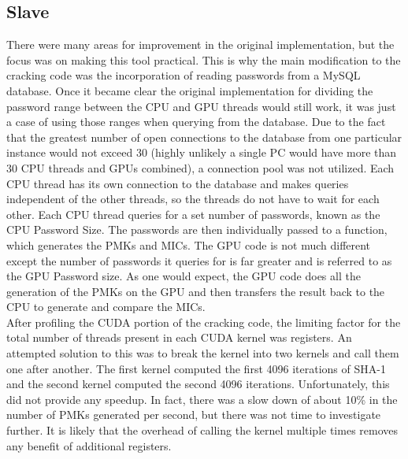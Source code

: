 \documentclass[12pt]{article}
\begin{document}
\subsection{Slave}
\indent There were many areas for improvement in the original implementation, but the focus was on making this tool practical. This is why the main modification to the cracking code was the incorporation of reading passwords from a MySQL database. Once it became clear the original implementation for dividing the password range between the CPU and GPU threads would still work, it was just a case of using those ranges when querying from the database. Due to the fact that the greatest number of open connections to the database from one particular instance would not exceed 30 (highly unlikely a single PC would have more than 30 CPU threads and GPUs combined), a connection pool was not utilized. Each CPU thread has its own connection to the database and makes queries independent of the other threads, so the threads do not have to wait for each other. Each CPU thread queries for a set number of passwords, known as the CPU Password Size. The passwords are then individually passed to a function, which generates the PMKs and MICs. The GPU code is not much different except the number of passwords it queries for is far greater and is referred to as the GPU Password size. As one would expect, the GPU code does all the generation of the PMKs on the GPU and then transfers the result back to the CPU to generate and compare the MICs.\\
\indent After profiling the CUDA portion of the cracking code, the limiting factor for the total number of threads present in each CUDA kernel was registers. An attempted solution to this was to break the kernel into two kernels and call them one after another. The first kernel computed the first 4096 iterations of SHA-1 and the second kernel computed the second 4096 iterations. Unfortunately, this did not provide any speedup. In fact, there was a slow down of about 10\% in the number of PMKs generated per second, but there was not time to investigate further. It is likely that the overhead of calling the kernel multiple times removes any benefit of additional registers.
\end{document}
